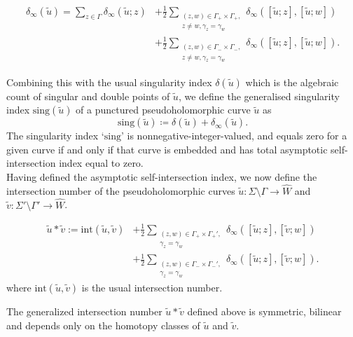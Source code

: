 \documentclass[11pt, a4paper]{amsart}
\begin{document}
\begin{equation*}
    \begin{split}
\delta_{\infty}(\tilde{u})=\sum_{z\in \Gamma} \delta_{\infty}(\tilde{u}; z) &+ \frac{1}{2}\sum\limits_{\substack{(z,w)\in \Gamma_+ \times \Gamma_+,\\ z \neq w, \gamma_z =\gamma_w}}\delta_{\infty}\left([\tilde{u}; z], [\tilde{u}; w]\right)\\
&+ \frac{1}{2}\sum\limits_{\substack{(z,w)\in \Gamma_- \times \Gamma_-,\\ z \neq w, \gamma_z =\gamma_w}}\delta_{\infty}\left([\tilde{u}; z], [\tilde{u}; w]\right).
    \end{split}
\end{equation*}

Combining this with the usual singularity index $\delta(\tilde{u})$ which is the algebraic count of singular and double points of $\tilde{u}$, we define the generalised singularity index $\mathrm{sing}(\tilde{u})$ of a punctured pseudoholomorphic curve $\tilde{u}$ as
$$\mathrm{sing}(\tilde{u})\coloneqq \delta(\tilde{u}) + \delta_{\infty}(\tilde{u}).$$
The singularity index `$\mathrm{sing}$' is nonnegative-integer-valued, and equals zero for a given curve if and only if that curve is embedded and has total asymptotic self-intersection index equal to zero.\\

Having defined the asymptotic self-intersection index, we now define the intersection number of the pseudoholomorphic curves $\tilde{u}: \Sigma\setminus \Gamma \rightarrow \widehat{W}$ and $\tilde{v}: \Sigma'\setminus \Gamma' \rightarrow \widehat{W}$.

\begin{equation*}
    \begin{split}
    \tilde{u}*\tilde{v}:= \mathrm{int}(\tilde{u}, \tilde{v})  &+ \frac{1}{2}\sum\limits_{\substack{(z,w)\in \Gamma_+ \times \Gamma_+',\\ \gamma_z =\gamma_w}}\delta_{\infty}\left([\tilde{u}; z], [\tilde{v}; w]\right)\\
    &+ \frac{1}{2}\sum\limits_{\substack{(z,w)\in \Gamma_- \times \Gamma_-',\\ \gamma_z =\gamma_w}}\delta_{\infty}\left([\tilde{u}; z], [\tilde{v}; w]\right).
    \end{split}
\end{equation*}
where $\mathrm{int}(\tilde{u}, \tilde{v})$ is the usual intersection number.

\begin{theorem}\cite[Proposition~4.3]{Siefinter2009}
The generalized intersection number $\tilde{u}*\tilde{v}$ defined above is symmetric, bilinear and depends only on the homotopy classes of $\tilde{u}$ and $\tilde{v}$.
\end{theorem}
\end{document}
